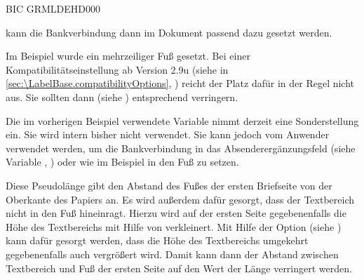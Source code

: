 \begin{Example}
\begin{lstcode}
{                        BIC GRMLDEHD000}
\end{lstcode}
  kann die Bankverbindung dann im Dokument passend dazu gesetzt werden.%

\end{Example}

Im Beispiel wurde ein mehrzeiliger Fuß gesetzt. Bei einer
Kompatibilitätseinstellung ab Version
2.9u (siehe
 in
\autoref{sec:\LabelBase.compatibilityOptions},
) reicht der Platz dafür in der Regel
nicht aus. Sie sollten dann  (siehe
) entsprechend
verringern.%
\EndIndexGroup

\begin{Declaration}
\end{Declaration}%
 Die im vorherigen Beispiel
verwendete Variable  nimmt derzeit eine Sonderstellung
ein. Sie wird intern bisher nicht verwendet. Sie kann jedoch vom Anwender
verwendet werden, um die Bankverbindung in das
Absenderergänzungsfeld (siehe Variable ,
) oder wie im Beispiel in den Fuß zu
setzen.%
%
\EndIndexGroup

\begin{Declaration}
\end{Declaration}
Diese Pseudolänge gibt den Abstand des Fußes der ersten Briefseite von der
Oberkante des Papiers an. Es wird außerdem dafür gesorgt, dass der Textbereich
nicht in den Fuß hineinragt. Hierzu wird auf der ersten Seite gegebenenfalls
die Höhe des Textbereichs mit Hilfe von
%
 verkleinert. Mit Hilfe der Option
%
 (siehe
) kann dafür gesorgt werden,
dass die Höhe des Textbereichs umgekehrt gegebenenfalls auch vergrößert
wird. Damit kann dann der Abstand zwischen Textbereich und Fuß der ersten
Seite auf den Wert der Länge
verringert werden.


